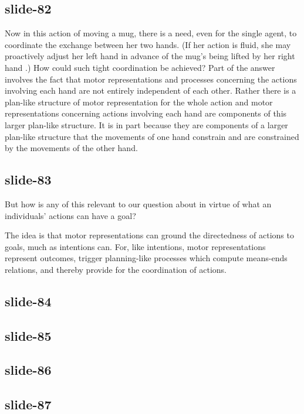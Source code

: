 \documentclass[12pt,\papersize]{extarticle}
\begin{document}
\subsection{slide-82}
Now in this action of moving a mug, there is a need, even for the single agent, to coordinate the
exchange between her two hands.
(If her action is fluid,
she may proactively adjust her left hand in advance of the mug’s being lifted by her right hand
\citep[compare][]{diedrichsen:2003_anticipatory,hugon:1982_anticipatory, lum:1992_feedforward}.)
How could such tight coordination be achieved?
Part of the answer involves the fact that motor representations and processes concerning the
actions involving each hand are not entirely independent of each other.
Rather there is a plan-like structure of motor representation for the whole action and motor
representations concerning actions involving each hand are components of this larger plan-like structure.
It is in part because they are components of a larger plan-like structure that the movements of
one hand constrain and are constrained by the movements of the other hand.

\subsection{slide-83}
But how is any of this relevant to our question about in virtue of what an individuals’ actions can
have a goal?

The idea is that motor representations can ground the directedness of actions to goals,
much as intentions can.
For, like intentions, motor representations represent outcomes, trigger
planning-like processes which compute means-ends relations, and thereby provide
for the coordination of actions.

\subsection{slide-84}

\subsection{slide-85}

\subsection{slide-86}

\subsection{slide-87}
\end{document}
